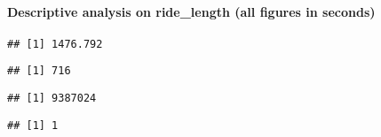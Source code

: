 \documentclass[
]{article}
\newenvironment{Shaded}{\begin{snugshade}}{\end{snugshade}}
\newcommand{\CommentTok}[1]{\textcolor[rgb]{0.56,0.35,0.01}{\textit{#1}}}
\newcommand{\FunctionTok}[1]{\textcolor[rgb]{0.00,0.00,0.00}{#1}}
\newcommand{\NormalTok}[1]{#1}
\newcommand{\SpecialCharTok}[1]{\textcolor[rgb]{0.00,0.00,0.00}{#1}}
\begin{document}
\hypertarget{descriptive-analysis-on-ride_length-all-figures-in-seconds}{%
\paragraph{Descriptive analysis on ride\_length (all figures in
seconds)}\label{descriptive-analysis-on-ride_length-all-figures-in-seconds}}

\begin{Shaded}
\end{Shaded}

\begin{verbatim}
## [1] 1476.792
\end{verbatim}

\begin{Shaded}
\end{Shaded}

\begin{verbatim}
## [1] 716
\end{verbatim}

\begin{Shaded}
\end{Shaded}

\begin{verbatim}
## [1] 9387024
\end{verbatim}

\begin{Shaded}
\end{Shaded}

\begin{verbatim}
## [1] 1
\end{verbatim}
\end{document}

